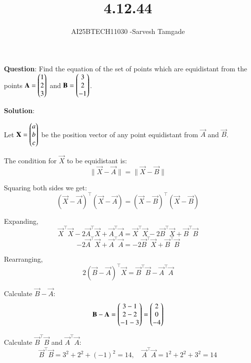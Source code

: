 \documentclass[journal]{IEEEtran}
\begin{document}

\vspace{3cm}

\title{4.12.44}
\author{AI25BTECH11030 -Sarvesh Tamgade}
{\let\newpage\relax\maketitle}

\renewcommand{\thefigure}{\theenumi}
\renewcommand{\thetable}{\theenumi}
\setlength{\intextsep}{10pt} 


\renewcommand{\thetable}{\theenumi}


\textbf{Question}: Find the equation of the set of points which are equidistant from the points \(\mathbf{A} = \begin{pmatrix}1 \\ 2 \\ 3\end{pmatrix}\) and \(\mathbf{B} = \begin{pmatrix}3 \\ 2 \\ -1\end{pmatrix}\).

\textbf{Solution}:

Let \(\mathbf{X} = \begin{pmatrix}a \\ b \\ c\end{pmatrix}\) be the position vector of any point equidistant from \(\vec{A}\) and \(\vec{B}\).

The condition for \(\vec{X}\) to be equidistant is:
\[
\|\vec{X} - \vec{A}\| = \|\vec{X} - \vec{B}\|
\]

Squaring both sides we get:
\[
(\vec{X} - \vec{A})^\top (\vec{X} - \vec{A}) = (\vec{X} - \vec{B})^\top (\vec{X} - \vec{B})
\]

Expanding,
\[
\vec{X}^\top \vec{X} - 2 \vec{A}^\top \vec{X} + \vec{A}^\top \vec{A} = \vec{X}^\top \vec{X} - 2 \vec{B}^\top \vec{X} + \vec{B}^\top \vec{B}
\]
\[
-2 \vec{A}^\top \vec{X} + \vec{A}^\top \vec{A} = -2 \vec{B}^\top \vec{X} + \vec{B}^\top \vec{B}
\]

Rearranging,
\[
2(\vec{B} - \vec{A})^\top \vec{X} = \vec{B}^\top \vec{B} - \vec{A}^\top \vec{A}
\]

Calculate \(\vec{B} - \vec{A}\):
\[
\mathbf{B} - \mathbf{A} = \begin{pmatrix}3 - 1 \\ 2 - 2 \\ -1 - 3\end{pmatrix} = \begin{pmatrix}2 \\ 0 \\ -4\end{pmatrix}
\]

Calculate \(\vec{B}^\top \vec{B}\) and \(\vec{A}^\top \vec{A}\):
\[
\vec{B}^\top \vec{B} = 3^2 + 2^2 + (-1)^2 = 14, \quad
\vec{A}^\top \vec{A} = 1^2 + 2^2 + 3^2 = 14
\]
\end{document}
